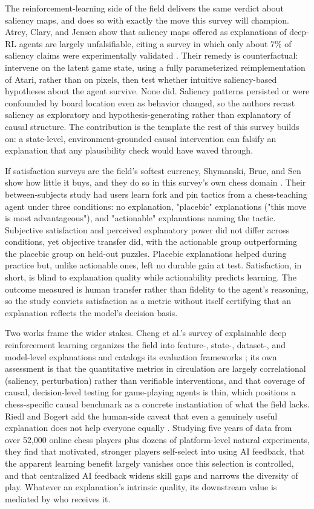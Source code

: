 \documentclass[conference]{IEEEtran}
\begin{document}
The reinforcement-learning side of the field delivers the same verdict about saliency maps, and does so with exactly the move this survey will champion. Atrey, Clary, and Jensen show that saliency maps offered as explanations of deep-RL agents are largely unfalsifiable, citing a survey in which only about 7\% of saliency claims were experimentally validated \cite{ref32}. Their remedy is counterfactual: intervene on the latent game state, using a fully parameterized reimplementation of Atari, rather than on pixels, then test whether intuitive saliency-based hypotheses about the agent survive. None did. Saliency patterns persisted or were confounded by board location even as behavior changed, so the authors recast saliency as exploratory and hypothesis-generating rather than explanatory of causal structure. The contribution is the template the rest of this survey builds on: a state-level, environment-grounded causal intervention can falsify an explanation that any plausibility check would have waved through.

If satisfaction surveys are the field's softest currency, Shymanski, Brue, and Sen show how little it buys, and they do so in this survey's own chess domain \cite{ref33}. Their between-subjects study had users learn fork and pin tactics from a chess-teaching agent under three conditions: no explanation, "placebic" explanations ("this move is most advantageous"), and "actionable" explanations naming the tactic. Subjective satisfaction and perceived explanatory power did not differ across conditions, yet objective transfer did, with the actionable group outperforming the placebic group on held-out puzzles. Placebic explanations helped during practice but, unlike actionable ones, left no durable gain at test. Satisfaction, in short, is blind to explanation quality while actionability predicts learning. The outcome measured is human transfer rather than fidelity to the agent's reasoning, so the study convicts satisfaction as a metric without itself certifying that an explanation reflects the model's decision basis.

Two works frame the wider stakes. Cheng et al.'s survey of explainable deep reinforcement learning organizes the field into feature-, state-, dataset-, and model-level explanations and catalogs its evaluation frameworks \cite{ref59}; its own assessment is that the quantitative metrics in circulation are largely correlational (saliency, perturbation) rather than verifiable interventions, and that coverage of causal, decision-level testing for game-playing agents is thin, which positions a chess-specific causal benchmark as a concrete instantiation of what the field lacks. Riedl and Bogert add the human-side caveat that even a genuinely useful explanation does not help everyone equally \cite{ref64}. Studying five years of data from over 52,000 online chess players plus dozens of platform-level natural experiments, they find that motivated, stronger players self-select into using AI feedback, that the apparent learning benefit largely vanishes once this selection is controlled, and that centralized AI feedback widens skill gaps and narrows the diversity of play. Whatever an explanation's intrinsic quality, its downstream value is mediated by who receives it.
\end{document}

